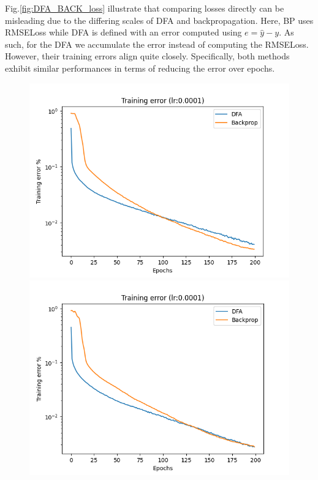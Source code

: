 \documentclass[english]{article}
\begin{document}
Fig.\ref{fig:DFA_BACK_loss} illustrate that comparing losses directly can be misleading due to the differing scales of DFA and backpropagation. Here, BP uses RMSELoss while DFA is defined with an error computed using \(e = \hat y - y \). As such, for the DFA we accumulate the error instead of computing the RMSELoss. However, their training errors align quite closely. Specifically, both methods exhibit similar performances in terms of reducing the error over epochs.



\begin{figure}[H]
    \centering
    \begin{minipage}{0.48\textwidth}
        \centering
        \includegraphics[width=\linewidth]{rsc/DFA_BACK/DFA_Back_COMP_TE.png}
    \end{minipage}%
    \begin{minipage}{0.48\textwidth}
        \centering
        \includegraphics[width=\linewidth]{rsc/DFA_BACK/DFA_Back_COMP_TE_DFA_close.png}

\end{minipage}
\end{figure}
\end{document}
